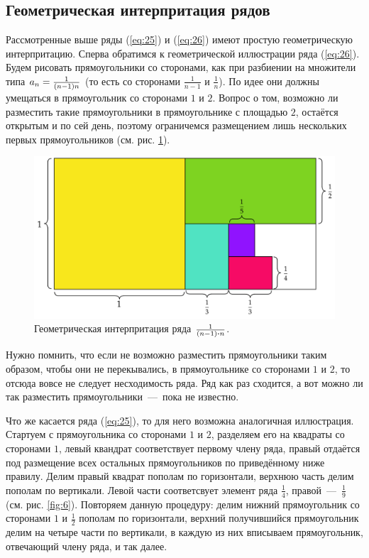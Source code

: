 \documentclass[12pt]{article}
\begin{document}
\subsection{Геометрическая интерпритация рядов}
Рассмотренные выше ряды (\ref{eq:25}) и (\ref{eq:26}) имеют простую геометрическую интерпритацию. Сперва обратимся к геометрической иллюстрации ряда (\ref{eq:26}). Будем рисовать прямоугольники со сторонами, как при разбиении на множители типа $a_n = \tfrac{1}{\qty(n-1)n}$ (то есть со сторонами $\tfrac{1}{n-1}$ и $\tfrac{1}{n}$). По идее они должны умещаться в прямоугольник со сторонами $1$ и $2$. Вопрос о том, возможно ли разместить такие прямоугольники в прямоугольнике с площадью $2$, остаётся открытым и по сей день, поэтому ограничемся размещением лишь нескольких первых прямоугольников (см. рис. \ref{fig:5}).
\begin{figure}[ht]
    \centering
    \includegraphics[width = 1\textwidth]{Лекция 2/fig5.png}
    \caption{Геометрическая интерпритация ряда $\tfrac{1}{\qty(n-1)\vdot n}$.}
    \label{fig:5}
\end{figure}
\par
Нужно помнить, что если не возможно разместить прямоугольники таким образом, чтобы они не перекывались, в прямоугольнике со сторонами $1$ и $2$, то отсюда вовсе не следует несходимость ряда. Ряд как раз сходится, а вот можно ли так разместить прямоугольники~\----~пока не известно.
\par
Что же касается ряда (\ref{eq:25}), то для него возможна аналогичная иллюстрация. Стартуем с прямоугольника со сторонами $1$ и $2$, разделяем его на квадраты со сторонами $1$, левый квандрат соответствует первому члену ряда, правый отдаётся под размещение всех остальных прямоугольников по приведённому ниже правилу. Делим правый квадрат пополам по горизонтали, верхнюю часть делим пополам по вертикали. Левой части соответсвует элемент ряда $\tfrac{1}{4}$, правой~\----~$\tfrac{1}{9}$ (см. рис. \ref{fig:6}). Повторяем данную процедуру: делим нижний прямоугольник со сторонами $1$ и $\tfrac{1}{2}$ пополам по горизонтали, верхний получившийся прямоугольник делим на четыре части по вертикали, в каждую из них вписываем прямоугольник, отвечающий члену ряда, и так далее.
\end{document}
